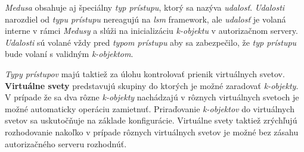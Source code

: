 \textit{Medusa} obsahuje aj špeciálny \textit{typ prístupu}, ktorý sa nazýva \textit{udalosť}. \textit{Udalosti} narozdiel od \textit{typu prístupu} nereagujú na \textit{lsm} framework, ale \textit{udalosť} je volaná interne v rámci \textit{Medusy} a slúži na inicializáciu \textit{k-objektu} v autorizačnom servery.\cite{kacer} \textit{Udalosti} sú volané vždy pred \textit{typom prístupu} aby sa zabezpečilo, že \textit{typ prístupu} bude volaní s validným \textit{k-objektom}.

\textit{Typy prístupov} majú taktiež za úlohu kontrolovať prienik virtuálnych svetov. \textbf{Virtuálne svety} predstavujú skupiny do ktorých je možné zaradovať \textit{k-objekty}. V prípade že sa dva rôzne \textit{k-objekty} nachádzajú v rôznych virtuálnych svetoch je možné automaticky operáciu zamietnuť. Priraďovanie \textit{k-objektov} do virtuálnych svetov sa uskutočňuje na základe konfigurácie. Virtuálne svety taktiež zrýchľujú rozhodovanie nakoľko v prípade rôznych virtuálnych svetov je možné bez zásahu autorizačného serveru rozhodnúť.

